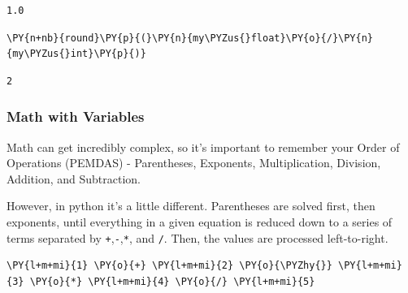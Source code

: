             \begin{tcolorbox}[breakable, size=fbox, boxrule=.5pt, pad at break*=1mm, opacityfill=0]
\begin{Verbatim}[commandchars=\\\{\}]
1.0
\end{Verbatim}
\end{tcolorbox}
        
    \begin{tcolorbox}[breakable, size=fbox, boxrule=1pt, pad at break*=1mm,colback=cellbackground, colframe=cellborder]
\begin{Verbatim}[commandchars=\\\{\}]
\PY{n+nb}{round}\PY{p}{(}\PY{n}{my\PYZus{}float}\PY{o}{/}\PY{n}{my\PYZus{}int}\PY{p}{)}
\end{Verbatim}
\end{tcolorbox}

            \begin{tcolorbox}[breakable, size=fbox, boxrule=.5pt, pad at break*=1mm, opacityfill=0]
\begin{Verbatim}[commandchars=\\\{\}]
2
\end{Verbatim}
\end{tcolorbox}
        
    \hypertarget{math-with-variables}{%
\subsubsection{Math with Variables}\label{math-with-variables}}

Math can get incredibly complex, so it's important to remember your
Order of Operations (PEMDAS) - Parentheses, Exponents, Multiplication,
Division, Addition, and Subtraction.

However, in python it's a little different. Parentheses are solved
first, then exponents, until everything in a given equation is reduced
down to a series of terms separated by \texttt{+},\texttt{-},\texttt{*},
and \texttt{/}. Then, the values are processed left-to-right.

    \begin{tcolorbox}[breakable, size=fbox, boxrule=1pt, pad at break*=1mm,colback=cellbackground, colframe=cellborder]
\begin{Verbatim}[commandchars=\\\{\}]
\PY{l+m+mi}{1} \PY{o}{+} \PY{l+m+mi}{2} \PY{o}{\PYZhy{}} \PY{l+m+mi}{3} \PY{o}{*} \PY{l+m+mi}{4} \PY{o}{/} \PY{l+m+mi}{5}
\end{Verbatim}
\end{tcolorbox}

